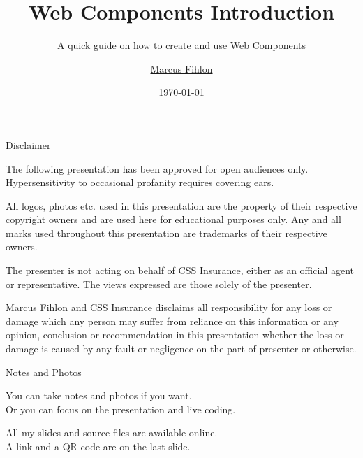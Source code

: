 \documentclass{beamer}
\title{Web Components Introduction}
\subtitle{A quick guide on how to create and use Web Components}
\author{\href{https://www.fihlon.ch/}{Marcus Fihlon}}
\institute[Fihlon]{\href{https://www.fihlon.ch/}{Scrum Master | Software Engineer | Lecturer | Speaker}}
\date{\today}
\newcommand{\slide}[2]{
	\begin{frame}{#1}
		#2
	\end{frame}
}
\begin{document}
\maketitle
\newlength\someheight

\slide{Disclaimer}{
	\begin{small}
		The following presentation has been approved for open audiences only. Hypersensitivity to occasional profanity requires covering ears.
		
		All logos, photos etc. used in this presentation are the property of their respective copyright owners and are used here for educational purposes only. Any and all marks used throughout this presentation are trademarks of their respective owners.
		
		The presenter is not acting on behalf of CSS Insurance, either as an official agent or representative. The views expressed are those solely of the presenter.
		
		Marcus Fihlon and CSS Insurance disclaims all responsibility for any loss or damage which any person may suffer from reliance on this information or any opinion, conclusion or recommendation in this presentation whether the loss or damage is caused by any fault or negligence on the part of presenter or otherwise.
	\end{small}
}

\slide{Notes and Photos}{
	\begin{center}
		You can take notes and photos if you want. \\
		Or you can focus on the presentation and live coding.
		
		All my slides and source files are available online. \\
		A link and a QR code are on the last slide.
	\end{center}
}
\end{document}
